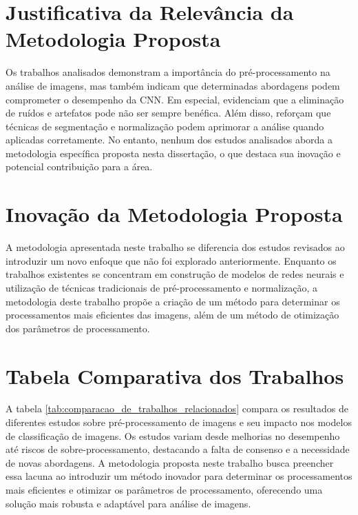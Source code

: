 \section{Justificativa da Relevância da Metodologia Proposta}

Os trabalhos analisados demonstram a importância do pré-processamento na análise de imagens, mas também indicam que determinadas abordagens podem comprometer o desempenho da CNN. Em especial,  evidenciam que a eliminação de ruídos e artefatos pode não ser sempre benéfica. Além disso,  reforçam que técnicas de segmentação e normalização podem aprimorar a análise quando aplicadas corretamente. No entanto, nenhum dos estudos analisados aborda a metodologia específica proposta nesta dissertação, o que destaca sua inovação e potencial contribuição para a área.

\section{Inovação da Metodologia Proposta}

A metodologia apresentada neste trabalho se diferencia dos estudos revisados ao introduzir um novo enfoque que não foi explorado anteriormente. Enquanto os trabalhos existentes se concentram em construção de modelos de redes neurais e utilização de técnicas tradicionais de pré-processamento e normalização, a metodologia deste trabalho propõe a criação de um método para determinar os processamentos mais eficientes das imagens, além de um método de otimização dos parâmetros de processamento.

\section{Tabela Comparativa dos Trabalhos}

A tabela \ref{tab:comparacao_de_trabalhos_relacionados} compara os resultados de diferentes estudos sobre pré-processamento de imagens e seu impacto nos modelos de classificação de imagens. Os estudos variam desde melhorias no desempenho até riscos de sobre-processamento, destacando a falta de consenso e a necessidade de novas abordagens. A metodologia proposta neste trabalho busca preencher essa lacuna ao introduzir um método inovador para determinar os processamentos mais eficientes e otimizar os parâmetros de processamento, oferecendo uma solução mais robusta e adaptável para análise de imagens.

